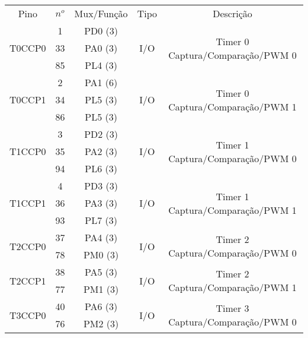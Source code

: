 \begin{center}
	\begin{longtable}{|c|c|c|c|c|}
		\rowcolor[HTML]{000000}
		{\color[HTML]{FFFFFF} Pino} & {\color[HTML]{FFFFFF} $n^{o}$} & {\color[HTML]{FFFFFF} Mux/Função} & {\color[HTML]{FFFFFF} Tipo} & {\color[HTML]{FFFFFF} Descrição}            \\
		\multirow{3}{*}{T0CCP0}    & 1   & PD0 (3) & \multirow{3}{*}{I/O} & \multirow{3}{*}{Timer 0 Captura/Comparação/PWM 0}\\
		& 33  & PA0 (3) &     &                                 \\
		& 85  & PL4 (3) &     &                                 \\ \hline
		\multirow{3}{*}{T0CCP1}    & 2   & PA1 (6) & \multirow{3}{*}{I/O} & \multirow{3}{*}{Timer 0 Captura/Comparação/PWM 1}\\
		& 34  & PL5 (3) &     &                                 \\
		& 86  & PL5 (3) &     &                                 \\ \hline
		\multirow{3}{*}{T1CCP0}    & 3   & PD2 (3) & \multirow{3}{*}{I/O} & \multirow{3}{*}{Timer 1 Captura/Comparação/PWM 0}\\
		& 35  & PA2 (3) &     &                                 \\
		& 94  & PL6 (3) &     &                                 \\ \hline
		\multirow{3}{*}{T1CCP1}    & 4   & PD3 (3) & \multirow{3}{*}{I/O} & \multirow{3}{*}{Timer 1 Captura/Comparação/PWM 1}\\
		& 36  & PA3 (3) &     &                                 \\
		& 93  & PL7 (3) &     &                                 \\ \hline
		\multirow{2}{*}{T2CCP0}   & 37  & PA4 (3) & \multirow{2}{*}{I/O} & \multirow{2}{*}{Timer 2 Captura/Comparação/PWM 0}\\
		& 78  & PM0 (3) &     &                                 \\ \hline
		\multirow{2}{*}{T2CCP1}    & 38  & PA5 (3) & \multirow{2}{*}{I/O} & \multirow{2}{*}{Timer 2 Captura/Comparação/PWM 1}\\
		& 77  & PM1 (3) &     &                                 \\ \hline
		\multirow{3}{*}{T3CCP0}    & 40  & PA6 (3) & \multirow{3}{*}{I/O} & \multirow{3}{*}{Timer 3 Captura/Comparação/PWM 0}\\
		& 76  & PM2 (3) &     &                                 \\ 

\end{longtable}
\end{center}
